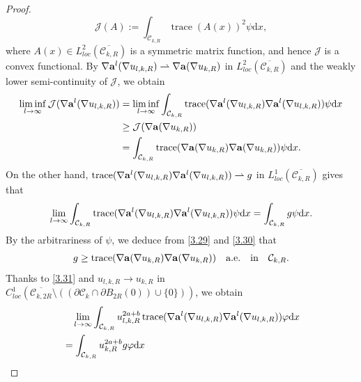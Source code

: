\documentclass[12pt]{amsart}
\theoremstyle{definition}
\theoremstyle{remark}
\theoremstyle{conclusion}
\theoremstyle{conjecture}
\numberwithin{equation}{section}
\begin{document}
\begin{proof}
$$\mathcal{J}(A):=\int_{\mathcal{C}_{k,R}}\operatorname{trace}(A(x))^2\psi\mathrm{d}x,$$
where $A(x)\in L^2_{loc}(\overline{\mathcal{C}_{k,R}})$ is a symmetric matrix function, and hence $\mathcal{J}$ is a convex functional. By $\nabla{\bf{a}}^l(\nabla u_{l,k,R})\rightharpoonup  \nabla{\bf{a}}(\nabla u_{k,R})$ in $L^2_{loc}(\overline{\mathcal{C}_{k,R}})$ and the weakly lower semi-continuity of $\mathcal{J}$, we obtain
\begin{equation}\label{3.29}
\begin{aligned}
  \liminf\limits_{l\rightarrow\infty}\mathcal{J}(\nabla {\bf{a}}^l(\nabla u_{l,k,R}))
  &=\liminf\limits_{l\rightarrow\infty}\int_{\mathcal{C}_{k,R}}\operatorname{trace}(\nabla {\bf{a}}^l(\nabla u_{l,k,R})\nabla {\bf{a}}^l(\nabla u_{l,k,R}))\psi\mathrm{d}x\\
  &\geq \mathcal{J}(\nabla {\bf{a}}(\nabla u_{k,R})) \\
  &=\int_{\mathcal{C}_{k,R}}\operatorname{trace}(\nabla {\bf{a}}(\nabla u_{k,R})\nabla {\bf{a}}(\nabla u_{k,R}))\psi\mathrm{d}x.
\end{aligned}
\end{equation}
On the other hand, $\operatorname{trace}(\nabla {\bf{a}}^l(\nabla u_{l,k,R})\nabla {\bf{a}}^l(\nabla u_{l,k,R}))\rightharpoonup g$ in $L^1_{loc}(\overline{\mathcal{C}_{k,R}})$ gives that
\begin{equation}\label{3.30}
\lim\limits_{l\rightarrow\infty}\int_{\mathcal{C}_{k,R}}\operatorname{trace}(\nabla {\bf{a}}^l(\nabla u_{l,k,R})\nabla {\bf{a}}^l(\nabla u_{l,k,R}))\psi\mathrm{d}x=\int_{\mathcal{C}_{k,R}}g\psi\mathrm{d}x.
\end{equation}
By the arbitrariness of $\psi$, we deduce from \eqref{3.29} and \eqref{3.30} that
\begin{equation}\label{3.31}
  g\geq \operatorname{trace}(\nabla {\bf{a}}(\nabla u_{k,R})\nabla {\bf{a}}(\nabla u_{k,R}))\quad\text{a.e.}\quad\text{in}\quad \mathcal{C}_{k,R}.
\end{equation}
Thanks to \eqref{3.31} and $u_{l,k,R}\rightarrow u_{k,R}$ in $C^{1}_{loc}(\overline{\mathcal{C}_{k,2R}}\setminus((\partial\mathcal{C}_k\cap\partial B_{2R}(0))\cup\{0\}))$, we obtain
\begin{equation}\label{3.32}
\begin{aligned}
  &\quad \lim\limits_{l\rightarrow\infty}\int_{\mathcal{C}_{k,R}}u_{l,k,R}^{2a+b}\operatorname{trace}(\nabla {\bf{a}}^l(\nabla u_{l,k,R})\nabla {\bf{a}}^l(\nabla u_{l,k,R}))\varphi\mathrm{d}x \\ &
  =\int_{\mathcal{C}_{k,R}}u_{k,R}^{2a+b}g\varphi\mathrm{d}x\\

\end{aligned}
\end{equation}
\end{proof}
\end{document}
